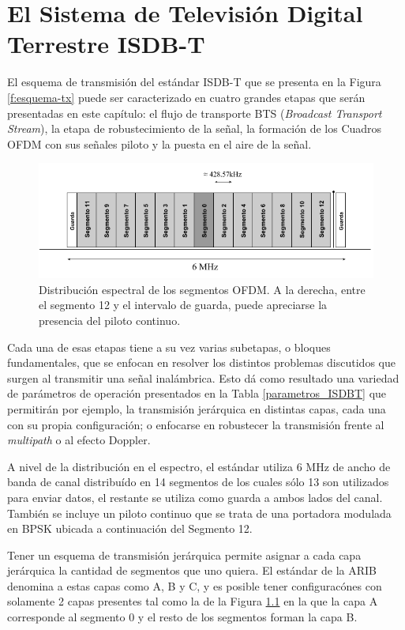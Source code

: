 \chapter{El Sistema de Televisión Digital Terrestre ISDB-T}

El esquema de transmisión del estándar ISDB-T que se presenta en la Figura \ref{f:esquema-tx} puede ser caracterizado en cuatro grandes etapas que serán presentadas en este capítulo: el flujo de transporte BTS (\textit{Broadcast Transport Stream}), la etapa de robustecimiento de la señal, la formación de los Cuadros OFDM con sus señales piloto y la puesta en el aire de la señal.

\begin{figure}[h!]
	\centering
	\includegraphics[scale=0.55]{figuras/cap03/segmentos_isdbt}
	\caption{\label{segmentos_isdbt} Distribuci\'on espectral de los segmentos OFDM. A la derecha, entre el segmento 12 y el intervalo de guarda, puede apreciarse la presencia del piloto continuo.}
\end{figure}

Cada una de esas etapas tiene a su vez varias subetapas, o bloques fundamentales, que se enfocan en resolver los distintos problemas discutidos que surgen al transmitir una señal inalámbrica. Esto dá como resultado una variedad de parámetros de operación presentados en la Tabla \ref{parametros_ISDBT} que permitirán por ejemplo, la transmisión jerárquica en distintas capas, cada una con su propia configuración; o enfocarse en robustecer la transmisión frente al \textit{multipath} o al efecto Doppler.

A nivel de la distribuci\'on en el espectro, el estándar utiliza 6 MHz de ancho de banda de canal distribu\'ido en 14 segmentos de los cuales sólo 13 son utilizados para enviar datos, el restante se utiliza como guarda a ambos lados del canal. Tambi\'en se incluye un piloto continuo que se trata de una portadora modulada en BPSK ubicada a continuaci\'on del Segmento 12.

Tener un esquema de transmisi\'on jer\'arquica permite asignar a cada capa jer\'arquica la cantidad de segmentos que uno quiera. El est\'andar de la ARIB denomina a estas capas como A, B y C, y es posible tener configurac\'ones con solamente 2 capas presentes tal como la de la Figura \ref{segmentos_isdbt} en la que la capa A corresponde al segmento 0 y el resto de los segmentos forman la capa B.

